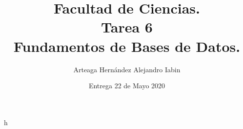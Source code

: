\documentclass{report}
\title{Facultad de Ciencias. \\Tarea 6 \\ Fundamentos de Bases de             Datos.}
\author{Arteaga Hernández Alejandro Iabin }
\date{Entrega 22 de Mayo 2020}
\begin{document}
h
\end{document}
